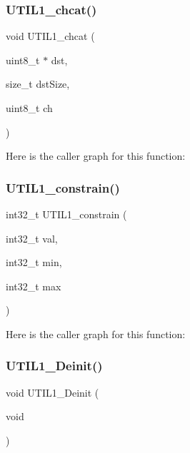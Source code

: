 \subsubsection{\texorpdfstring{U\+T\+I\+L1\+\_\+chcat()}{UTIL1\_chcat()}}
{\footnotesize\ttfamily void U\+T\+I\+L1\+\_\+chcat (\begin{DoxyParamCaption}\item[{uint8\+\_\+t $\ast$}]{dst,  }\item[{size\+\_\+t}]{dst\+Size,  }\item[{uint8\+\_\+t}]{ch }\end{DoxyParamCaption})}

Here is the caller graph for this function\+:
\mbox{\label{group___u_t_i_l1__module_ga6e909658d884ed9b7ef5c20cc08a3df0}} 
\subsubsection{\texorpdfstring{U\+T\+I\+L1\+\_\+constrain()}{UTIL1\_constrain()}}
{\footnotesize\ttfamily int32\+\_\+t U\+T\+I\+L1\+\_\+constrain (\begin{DoxyParamCaption}\item[{int32\+\_\+t}]{val,  }\item[{int32\+\_\+t}]{min,  }\item[{int32\+\_\+t}]{max }\end{DoxyParamCaption})}

Here is the caller graph for this function\+:
\mbox{\label{group___u_t_i_l1__module_ga9f87fcb2c95a4043e5fa57bc77cb6948}} 
\subsubsection{\texorpdfstring{U\+T\+I\+L1\+\_\+\+Deinit()}{UTIL1\_Deinit()}}
{\footnotesize\ttfamily void U\+T\+I\+L1\+\_\+\+Deinit (\begin{DoxyParamCaption}\item[{void}]{ }\end{DoxyParamCaption})}

